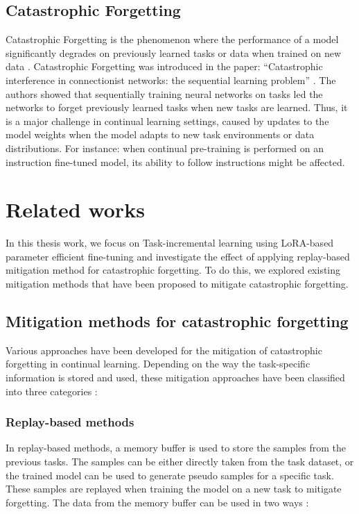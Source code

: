 \subsection{Catastrophic Forgetting}
Catastrophic Forgetting is the phenomenon where the performance of a model significantly degrades on previously learned tasks or data when trained on new data \cite{wang2023comprehensive}. Catastrophic Forgetting was introduced in the paper: “Catastrophic interference in connectionist networks: the sequential learning problem” \cite{mccloskey1989catastrophic}. The authors showed that sequentially training neural networks on tasks led the networks to forget previously learned tasks when new tasks are learned. Thus, it is a major challenge in continual learning settings, caused by updates to the model weights when the model adapts to new task environments or data distributions. For instance: when continual pre-training is performed on an instruction fine-tuned model, its ability to follow instructions might be affected.

\section{Related works} \label{RelatedWorks}
In this thesis work, we focus on Task-incremental learning using LoRA-based parameter efficient fine-tuning and investigate the effect of applying replay-based mitigation method for catastrophic forgetting.  To do this, we explored existing mitigation methods that have been proposed to mitigate catastrophic forgetting.  

\subsection{Mitigation methods for catastrophic forgetting} \label{MitigationMethods}
Various approaches have been developed for the mitigation of catastrophic forgetting in continual learning. Depending on the way the task-specific information is stored and used, these mitigation approaches have been classified into three categories \cite{de2021continual}:

\subsubsection{Replay-based methods} \label{Replay}
In replay-based methods, a memory buffer is used to store the samples from the previous tasks. The samples can be either directly taken from the task dataset, or the trained model can be used to generate pseudo samples for a specific task. These samples are replayed when training the model on a new task to mitigate forgetting. The data from the memory buffer can be used in two ways \cite{de2021continual}:

